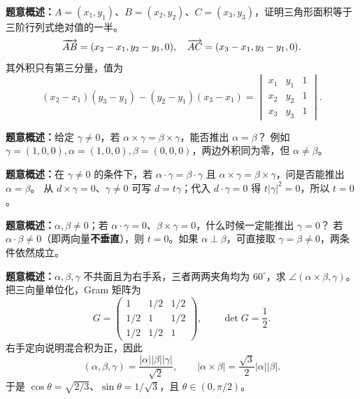 \textbf{题意概述：}$A=(x_1,y_1)$、$B=(x_2,y_2)$、$C=(x_3,y_3)$，证明三角形面积等于三阶行列式绝对值的一半。
\[
\overrightarrow{AB}=(x_2-x_1,y_2-y_1,0),\quad
\overrightarrow{AC}=(x_3-x_1,y_3-y_1,0).
\]
其外积只有第三分量，值为
\[
(x_2-x_1)(y_3-y_1)-(y_2-y_1)(x_3-x_1)
=\begin{vmatrix}x_1&y_1&1\\x_2&y_2&1\\x_3&y_3&1\end{vmatrix}.
\]

\textbf{题意概述：}给定 $\gamma\ne0$，若 $\alpha\times\gamma=\beta\times\gamma$，能否推出 $\alpha=\beta$？
例如 $\gamma=(1,0,0),\alpha=(1,0,0),\beta=(0,0,0)$，两边外积同为零，但 $\alpha\ne\beta$。

\textbf{题意概述：}在 $\gamma\ne0$ 的条件下，若 $\alpha\cdot\gamma=\beta\cdot\gamma$ 且 $\alpha\times\gamma=\beta\times\gamma$，问是否能推出 $\alpha=\beta$。
从 $d\times\gamma=0$、$\gamma\ne0$ 可写 $d=t\gamma$；代入 $d\cdot\gamma=0$ 得 $t|\gamma|^2=0$，所以 $t=0$。

\textbf{题意概述：}$\alpha,\beta\ne0$；若 $\alpha\cdot\gamma=0$、$\beta\times\gamma=0$，什么时候一定能推出 $\gamma=0$？
若 $\alpha\cdot\beta\ne0$（即两向量\textbf{不垂直}），则 $t=0$。如果 $\alpha\perp\beta$，可直接取 $\gamma=\beta\ne0$，两条件依然成立。

\textbf{题意概述：}$\alpha,\beta,\gamma$ 不共面且为右手系，三者两两夹角均为 $60^\circ$，求 $\angle(\alpha\times\beta,\gamma)$。
把三向量单位化，Gram 矩阵为
\[
G=\begin{pmatrix}1&1/2&1/2\\1/2&1&1/2\\1/2&1/2&1\end{pmatrix},\qquad \det G=\frac12.
\]
右手定向说明混合积为正，因此
\[
(\alpha,\beta,\gamma)=\frac{|\alpha||\beta||\gamma|}{\sqrt2},\qquad
|\alpha\times\beta|=\frac{\sqrt3}{2}|\alpha||\beta|.
\]
于是 $\cos\theta=\sqrt{2/3}$、$\sin\theta=1/\sqrt3$，且 $\theta\in(0,\pi/2)$。
